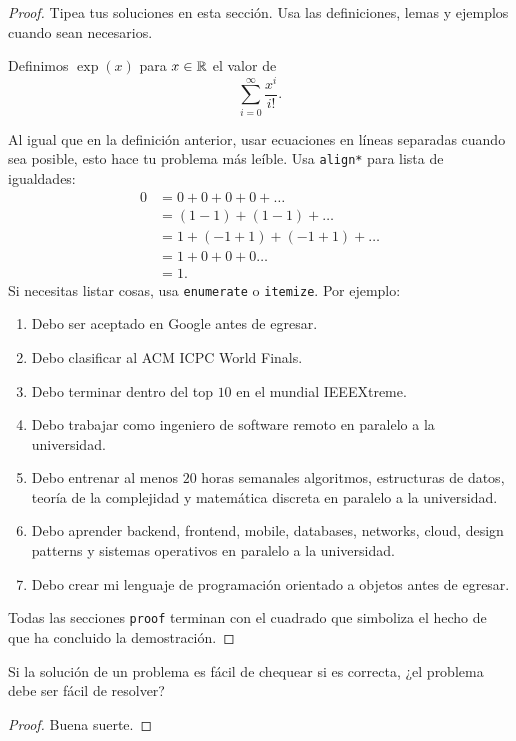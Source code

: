 \begin{proof}
    Tipea tus soluciones en esta secci\'on. Usa las definiciones, lemas y ejemplos cuando sean necesarios.
    \begin{defn}
        Definimos $\exp(x)$ para $x \in \mathbb{R}$ el valor de $$\sum_{i = 0}^\infty\frac{x^i}{i!}.$$
    \end{defn}
    Al igual que en la definici\'on anterior,
    usar ecuaciones en l\'ineas separadas cuando sea posible,
    esto hace tu problema m\'as le\'ible. Usa \texttt{align*} para lista de igualdades:
    \begin{align*}
        0 &= 0 + 0 + 0 + 0 + \dots\\
        &= (1 - 1) + (1 - 1) + \dots \\
        &= 1 + (-1 + 1) + (-1 + 1) + \dots \\
        &= 1 + 0 + 0 + 0 \dots \\
        &= 1.
    \end{align*}
    Si necesitas listar cosas, usa \texttt{enumerate} o \texttt{itemize}.
    Por ejemplo:
    \begin{enumerate}
        \item Debo ser aceptado en Google antes de egresar.
        \item Debo clasificar al ACM ICPC World Finals.
        \item Debo terminar dentro del top $10$ en el mundial IEEEXtreme.
        \item Debo trabajar como ingeniero de software remoto en paralelo a la universidad.
        \item Debo entrenar al menos $20$ horas semanales algoritmos, estructuras de datos,
        teor\'ia de la complejidad y matem\'atica discreta en paralelo a la universidad.
        \item Debo aprender backend, frontend, mobile, databases, networks, cloud,
        design patterns y sistemas operativos en paralelo a la universidad.
        \item Debo crear mi lenguaje de programaci\'on orientado a objetos antes de egresar.
    \end{enumerate}
    Todas las secciones \texttt{proof} terminan con el cuadrado que simboliza el hecho de que ha concluido la demostraci\'on.
\end{proof}

\begin{statement}{2}
    Si la soluci\'on de un problema es f\'acil de chequear si es correcta, ¿el problema debe ser f\'acil de resolver?
\end{statement}

\begin{proof}
    Buena suerte.
\end{proof}

